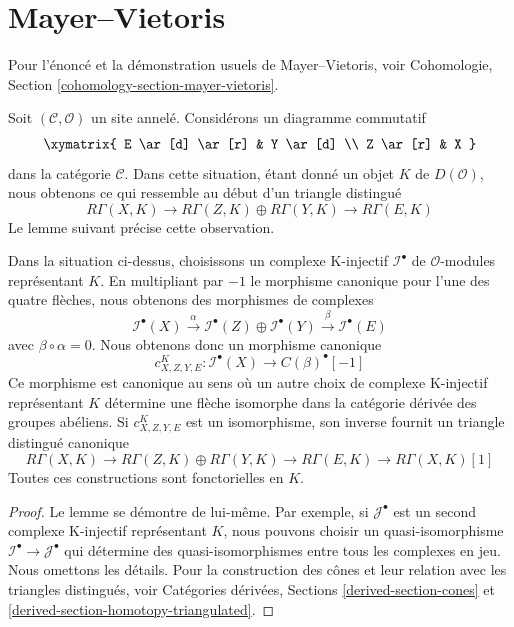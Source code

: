 \section{Mayer--Vietoris}
\label{section-mayer-vietoris}

\noindent
Pour l'énoncé et la démonstration usuels de Mayer--Vietoris, voir
Cohomologie, Section \ref{cohomology-section-mayer-vietoris}.

\medskip\noindent
Soit $(\mathcal{C}, \mathcal{O})$ un site annelé. Considérons un diagramme
commutatif
$$
\xymatrix{
E \ar[d] \ar[r] & Y \ar[d] \\
Z \ar[r] & X
}
$$
dans la catégorie $\mathcal{C}$. Dans cette situation, étant donné un objet
$K$ de $D(\mathcal{O})$, nous obtenons ce qui ressemble au début d'un
triangle distingué
$$
R\Gamma(X, K) \to
R\Gamma(Z, K) \oplus
R\Gamma(Y, K) \to
R\Gamma(E, K)
$$
Le lemme suivant précise cette observation.

\begin{lemma}
\label{lemma-c-square}
Dans la situation ci-dessus, choisissons un complexe K-injectif
$\mathcal{I}^\bullet$ de $\mathcal{O}$-modules représentant $K$. En
multipliant par $-1$ le morphisme canonique pour l'une des quatre flèches,
nous obtenons des morphismes de complexes
$$
\mathcal{I}^\bullet(X) \xrightarrow{\alpha}
\mathcal{I}^\bullet(Z) \oplus
\mathcal{I}^\bullet(Y) \xrightarrow{\beta}
\mathcal{I}^\bullet(E)
$$
avec $\beta \circ \alpha = 0$. Nous obtenons donc un morphisme canonique
$$
c^K_{X, Z, Y, E} :
\mathcal{I}^\bullet(X)
\longrightarrow
C(\beta)^\bullet[-1]
$$
Ce morphisme est canonique au sens où un autre choix de complexe
K-injectif représentant $K$ détermine une flèche isomorphe dans la
catégorie dérivée des groupes abéliens. Si $c^K_{X, Z, Y, E}$ est un
isomorphisme, son inverse fournit un triangle distingué canonique
$$
R\Gamma(X, K) \to
R\Gamma(Z, K) \oplus
R\Gamma(Y, K) \to
R\Gamma(E, K) \to
R\Gamma(X, K)[1]
$$
Toutes ces constructions sont fonctorielles en $K$.
\end{lemma}

\begin{proof}
Le lemme se démontre de lui-même. Par exemple, si
$\mathcal{J}^\bullet$ est un second complexe K-injectif représentant $K$,
nous pouvons choisir un quasi-isomorphisme
$\mathcal{I}^\bullet \to \mathcal{J}^\bullet$ qui détermine des
quasi-isomorphismes entre tous les complexes en jeu. Nous omettons les
détails. Pour la construction des cônes et leur relation avec les triangles
distingués, voir Catégories dérivées, Sections
\ref{derived-section-cones} et
\ref{derived-section-homotopy-triangulated}.
\end{proof}

